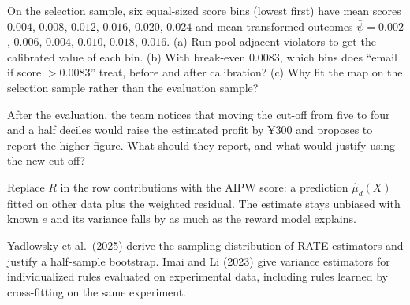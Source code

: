 \documentclass[11pt]{article}
\begin{document}
\begin{exercise}[computation]
On the selection sample, six equal-sized score bins (lowest first) have mean scores $0.004$, $0.008$, $0.012$, $0.016$, $0.020$, $0.024$ and
mean transformed outcomes $\bar\psi = 0.002$, $0.006$, $0.004$, $0.010$, $0.018$, $0.016$. (a) Run pool-adjacent-violators to get the
calibrated value of each bin. (b) With break-even $0.0083$, which bins does ``email if score $> 0.0083$'' treat, before and after
calibration? (c) Why fit the map on the selection sample rather than the evaluation sample?
\end{exercise}

\begin{exercise}[judgment]
After the evaluation, the team notices that moving the cut-off from five to four and a half deciles would raise the
estimated profit by ¥300 and proposes to report the higher figure. What should they report, and what would justify
using the new cut-off?
\end{exercise}

\sectionthree

\begin{extension}
Replace $R$ in the row contributions with the AIPW score: a prediction $\hat\mu_d(X)$ fitted on other data plus the weighted
residual. The estimate stays unbiased with known $e$ and its variance falls by as much as the reward model explains.
\end{extension}

\begin{extension}
Yadlowsky et al.\ (2025) derive the sampling distribution of RATE estimators and justify a half-sample bootstrap. Imai and Li
(2023) give variance estimators for individualized rules evaluated on experimental data, including rules learned by
cross-fitting on the same experiment.
\end{extension}
\end{document}

